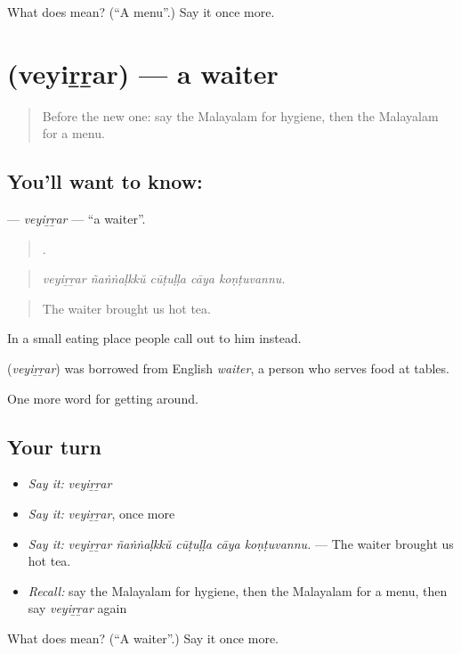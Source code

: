 \begin{tcolorbox}[breakable,colback=teal!4,colframe=teal!35!black,title={Before you move on}]
What does  mean? (\textquotedblleft{}A menu\textquotedblright{}.) Say it once more.
\end{tcolorbox}
\section[\texorpdfstring{\ml{വെയിറ്റർ} (veyiṟṟar)}{വെയിറ്റർ (veyiṟṟar)}]{ (veyiṟṟar) — a waiter}

\label{lesson:ML-C483-veyirrar}



\begin{quote}
Before the new one: say the Malayalam for hygiene, then the Malayalam for a menu.
\end{quote}

\subsection*{You'll want to know: }
\textbf{} — \emph{veyiṟṟar} — \textquotedblleft{}a waiter\textquotedblright{}.

\begin{quote}
    .
\end{quote}

\begin{quote}
\emph{veyiṟṟar ñaṅṅaḷkkŭ cūṭuḷḷa cāya koṇṭuvannu.}
\end{quote}

\begin{quote}
The waiter brought us hot tea.
\end{quote}

In a small eating place people call out  to him instead.

\begin{cousinweb}
\textbf{} (\emph{veyiṟṟar}) was borrowed from English \emph{waiter}, a person who serves food at tables.
\end{cousinweb}

\begin{grammarlens}[title={What you've built}]
One more word for getting around.
\end{grammarlens}

\subsection*{Your turn}
\begin{itemize}
\raggedright
  \item \emph{Say it:} \emph{veyiṟṟar}
  \item \emph{Say it:} \emph{veyiṟṟar}, once more
  \item \emph{Say it:} \emph{veyiṟṟar ñaṅṅaḷkkŭ cūṭuḷḷa cāya koṇṭuvannu.} — The waiter brought us hot tea.
  \item \emph{Recall:} say the Malayalam for hygiene, then the Malayalam for a menu, then say \emph{veyiṟṟar} again
\end{itemize}

\begin{tcolorbox}[breakable,colback=teal!4,colframe=teal!35!black,title={Before you move on}]
What does  mean? (\textquotedblleft{}A waiter\textquotedblright{}.) Say it once more.
\end{tcolorbox}

